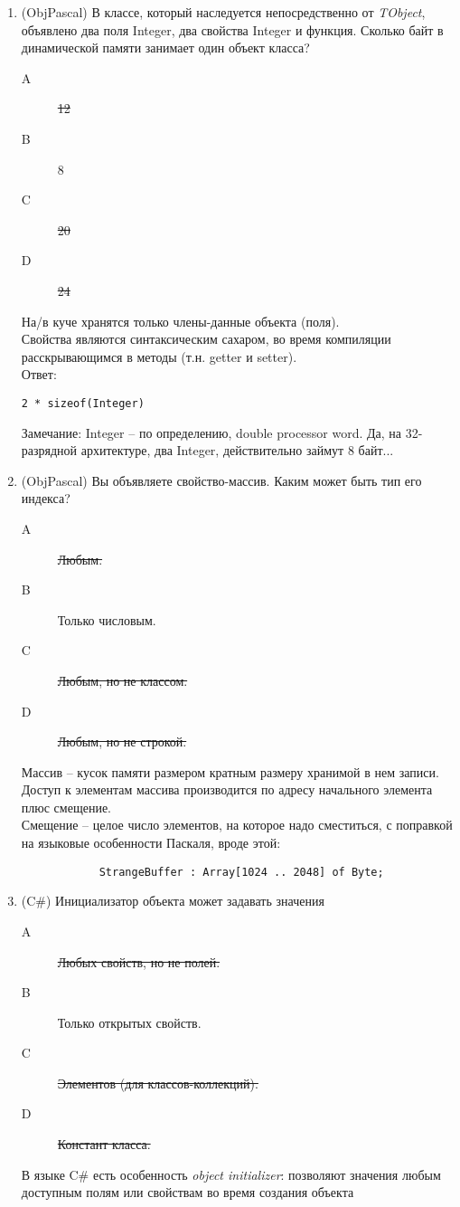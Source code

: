 \documentclass[12pt]{article}
\begin{document}
\begin{enumerate}
		\item (ObjPascal) В классе, который наследуется непосредственно от \emph{TObject}, объявлено два поля Integer, два свойства Integer и функция. Сколько байт в динамической памяти занимает один объект класса?
			\begin{description}
				\item[A] \sout{12}
				\item[B] 8
				\item[C] \sout{20}
				\item[D] \sout{24}
			\end{description}
			На/в куче хранятся только члены-данные объекта (поля).
			\\
			Свойства являются синтаксическим сахаром, во время компиляции расскрывающимся в методы (т.н. getter и setter).
			\\
			Ответ: \begin{verbatim}2 * sizeof(Integer)\end{verbatim}
			
			Замечание: Integer -- по определению, double processor word. Да, на 32-разрядной архитектуре, два Integer, действительно займут 8 байт...

		\item (ObjPascal) Вы объявляете свойство-массив. Каким может быть тип его индекса?
			\begin{description}
				\item[A] \sout{Любым.}
				\item[B] Только числовым.
				\item[C] \sout{Любым, но не классом.}
				\item[D] \sout{Любым, но не строкой.}
			\end{description}
			Массив -- кусок памяти размером кратным размеру хранимой в нем записи.
			\\
			Доступ к элементам массива производится по адресу начального элемента плюс смещение.
			\\
			Смещение -- целое число элементов, на которое надо сместиться, с поправкой на языковые особенности Паскаля, вроде этой:
			\begin{verbatim}
			StrangeBuffer : Array[1024 .. 2048] of Byte;
			\end{verbatim}

		\item (C\#) Инициализатор объекта может задавать значения
			\begin{description}
				\item[A] \sout{Любых свойств, но не полей.}
				\item[B] Только открытых свойств.
				\item[C] \sout{Элементов (для классов-коллекций).}
				\item[D] \sout{Констант класса.}
			\end{description}
			В языке C\# есть особенность \emph{object initializer}:
			позволяют значения любым доступным полям или свойствам во время создания объекта
			


\end{enumerate}
\end{document}
